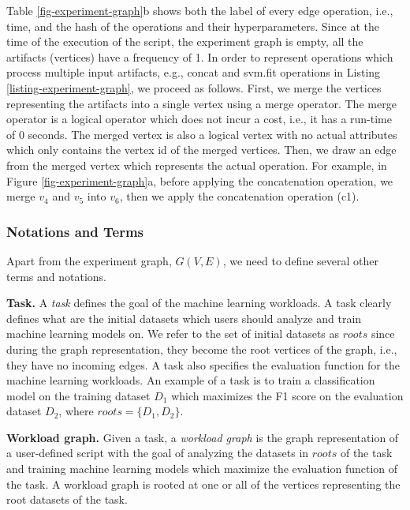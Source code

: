 Table \ref{fig-experiment-graph}b shows both the label of every edge operation, i.e., time, and the hash of the operations and their hyperparameters.
Since at the time of the execution of the script, the experiment graph is empty, all the artifacts (vertices) have a frequency of 1.
In order to represent operations which process multiple input artifacts, e.g., concat and svm.fit operations in Listing \ref{listing-experiment-graph}, we proceed as follows.
First, we merge the vertices representing the artifacts into a single vertex using a merge operator.
The merge operator is a logical operator which does not incur a cost, i.e., it has a run-time of 0 seconds.
The merged vertex is also a logical vertex with no actual attributes which only contains the vertex id of the merged vertices.
Then, we draw an edge from the merged vertex which represents the actual operation.
For example, in Figure \ref{fig-experiment-graph}a, before applying the concatenation operation, we merge $v_4$ and $v_5$ into $v_6$, then we apply the concatenation operation (c1).

\subsubsection{Notations and Terms}\label{notations-terms}
Apart from the experiment graph, $G(V, E)$, we need to define several other terms and notations.

\textbf{Task.} A \textit{task} defines the goal of the machine learning workloads. 
A task clearly defines what are the initial datasets which users should analyze and train machine learning models on. 
We refer to the set of initial datasets as $roots$ since during the graph representation, they become the root vertices of the graph, i.e., they have no incoming edges.
A task also specifies the evaluation function for the machine learning workloads.
An example of a task is to train a classification model on the training dataset $D_1$ which maximizes the F1 score on the evaluation dataset $D_2$, where $roots = \{D_1, D_2\}$.

\textbf{Workload graph.} Given a task, a \textit{workload graph} is the graph representation of a user-defined script with the goal of analyzing the datasets in $roots$ of the task and training machine learning models which maximize the evaluation function of the task.
A workload graph is rooted at one or all of the vertices representing the root datasets of the task.

